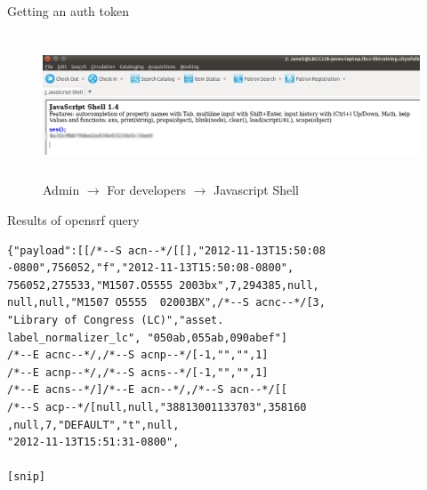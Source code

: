 \documentclass{beamer}
\begin{document}
\begin{frame}{Getting an auth token}
 \begin{figure}
  \begin{center}
   \includegraphics[height=1.7in]{ses.png}
   \caption{Admin $\rightarrow$ For developers $\rightarrow$ Javascript Shell}
  \end{center}

 \end{figure}


 
\end{frame}


\begin{frame}[fragile]{Results of opensrf query}

\begin{lstlisting}
{"payload":[[/*--S acn--*/[[],"2012-11-13T15:50:08
-0800",756052,"f","2012-11-13T15:50:08-0800",
756052,275533,"M1507.O5555 2003bx",7,294385,null,
null,null,"M1507 O5555  02003BX",/*--S acnc--*/[3,
"Library of Congress (LC)","asset.
label_normalizer_lc", "050ab,055ab,090abef"]
/*--E acnc--*/,/*--S acnp--*/[-1,"","",1]
/*--E acnp--*/,/*--S acns--*/[-1,"","",1]
/*--E acns--*/]/*--E acn--*/,/*--S acn--*/[[
/*--S acp--*/[null,null,"38813001133703",358160
,null,7,"DEFAULT","t",null,
"2012-11-13T15:51:31-0800",

[snip]

\end{lstlisting}
 
\end{frame}
\end{document}
